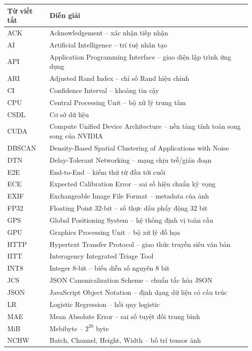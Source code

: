 \begin{longtable}{P{.14\textwidth}P{.78\textwidth}}
\toprule Từ viết tắt & Diễn giải \\\midrule\endhead
ACK & Acknowledgement -- xác nhận tiếp nhận \\
AI & Artificial Intelligence -- trí tuệ nhân tạo \\
API & Application Programming Interface -- giao diện lập trình ứng dụng \\
ARI & Adjusted Rand Index -- chỉ số Rand hiệu chỉnh \\
CI & Confidence Interval -- khoảng tin cậy \\
CPU & Central Processing Unit -- bộ xử lý trung tâm \\
CSDL & Cơ sở dữ liệu \\
CUDA & Compute Unified Device Architecture -- nền tảng tính toán song song của NVIDIA \\
DBSCAN & Density-Based Spatial Clustering of Applications with Noise \\
DTN & Delay-Tolerant Networking -- mạng chịu trễ/gián đoạn \\
E2E & End-to-End -- kiểm thử từ đầu tới cuối \\
ECE & Expected Calibration Error -- sai số hiệu chuẩn kỳ vọng \\
EXIF & Exchangeable Image File Format -- metadata của ảnh \\
FP32 & Floating Point 32-bit -- số thực dấu phẩy động 32 bit \\
GPS & Global Positioning System -- hệ thống định vị toàn cầu \\
GPU & Graphics Processing Unit -- bộ xử lý đồ họa \\
HTTP & Hypertext Transfer Protocol -- giao thức truyền siêu văn bản \\
IITT & Interagency Integrated Triage Tool \\
INT8 & Integer 8-bit -- biểu diễn số nguyên 8 bit \\
JCS & JSON Canonicalization Scheme -- chuẩn tắc hóa JSON \\
JSON & JavaScript Object Notation -- định dạng dữ liệu có cấu trúc \\
LR & Logistic Regression -- hồi quy logistic \\
MAE & Mean Absolute Error -- sai số tuyệt đối trung bình \\
MiB & Mebibyte -- $2^{20}$ byte \\
NCHW & Batch, Channel, Height, Width -- bố trí tensor ảnh \\

\end{longtable}
